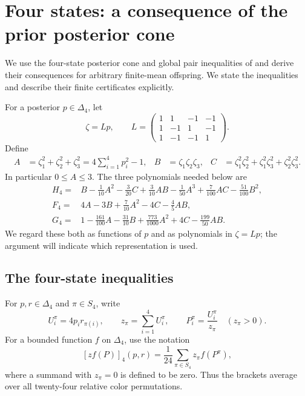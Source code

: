 
\section{Four states: a consequence of the prior posterior cone}
\label{sec:four-state-cone}

We use the four-state posterior cone and global pair inequalities of \cite{OpenAI4} and derive their consequences for arbitrary finite-mean offspring. We state the inequalities and describe their finite certificates explicitly.

For a posterior $p\in\Delta_4$, let
\[
 \zeta=Lp,\qquad
 L=\begin{pmatrix}
  1&1&-1&-1\\
  1&-1&1&-1\\
  1&-1&-1&1
 \end{pmatrix}.
\]
Define
\begin{align}
 A&=\zeta_1^2+\zeta_2^2+\zeta_3^2
      =4\sum_{i=1}^4p_i^2-1,
 & B&=\zeta_1\zeta_2\zeta_3,
 & C&=\zeta_1^2\zeta_2^2+\zeta_1^2\zeta_3^2+
       \zeta_2^2\zeta_3^2.
 \label{eq:q4-basic-polynomials}
\end{align}
In particular $0\le A\le3$.  The three polynomials needed below are
\begin{align}
 H_4={}&B-\frac1{10}A^2-\frac3{20}C+\frac3{10}AB
       -\frac1{50}A^3+\frac7{100}AC-\frac{51}{100}B^2,
       \label{eq:q4-H}\\
 F_4={}&4A-3B+\frac7{10}A^2-4C-\frac45AB,
       \label{eq:q4-F}\\
 G_4={}&1-\frac{161}{100}A-\frac{31}{10}B
       +\frac{773}{1000}A^2+4C-\frac{199}{50}AB.
       \label{eq:q4-G}
\end{align}
We regard these both as functions of $p$ and as polynomials in $\zeta=Lp$;
the argument will indicate which representation is used.

\subsection{The four-state inequalities}

For $p,r\in\Delta_4$ and $\pi\in S_4$, write
\[
 U_i^\pi=4p_i r_{\pi(i)},\qquad
 z_\pi=\sum_{i=1}^4U_i^\pi,\qquad
 P_i^\pi=\frac{U_i^\pi}{z_\pi}\quad(z_\pi>0).
\]
For a bounded function $f$ on $\Delta_4$, use the notation
\[
 [zf(P)]_4(p,r)=\frac1{24}\sum_{\pi\in S_4}z_\pi f(P^\pi),
\]
where a summand with $z_\pi=0$ is defined to be zero.  Thus the brackets
average over all twenty-four relative color permutations.


